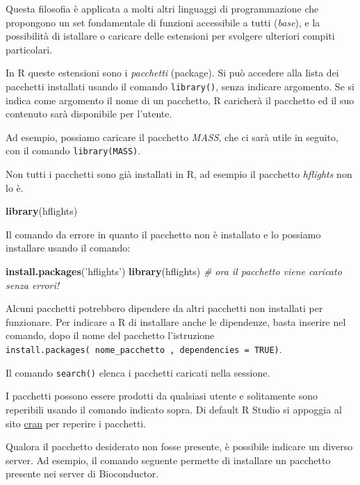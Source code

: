 \documentclass[]{book}
\newenvironment{Shaded}{\begin{snugshade}}{\end{snugshade}}
\newcommand{\CommentTok}[1]{\textcolor[rgb]{0.56,0.35,0.01}{\textit{#1}}}
\newcommand{\KeywordTok}[1]{\textcolor[rgb]{0.13,0.29,0.53}{\textbf{#1}}}
\newcommand{\NormalTok}[1]{#1}
\newcommand{\StringTok}[1]{\textcolor[rgb]{0.31,0.60,0.02}{#1}}
\begin{document}
Questa filosofia è applicata a molti altri linguaggi di programmazione che propongono un set fondamentale di funzioni accessibile a tutti (\emph{base}), e la possibilità di istallare o caricare delle estensioni per svolgere ulteriori compiti particolari.

In R queste estensioni sono i \emph{pacchetti} (package). Si può accedere alla lista dei pacchetti installati usando il comando \texttt{library()}, senza indicare argomento. Se si indica come argomento il nome di un pacchetto, R caricherà il pacchetto ed il suo contenuto sarà disponibile per l'utente.

Ad esempio, possiamo caricare il pacchetto \emph{MASS}, che ci sarà utile in seguito, con il comando \texttt{library(MASS)}.

Non tutti i pacchetti sono già installati in R, ad esempio il pacchetto \emph{hflights} non lo è.

\begin{Shaded}
\begin{Highlighting}[]
\KeywordTok{library}\NormalTok{(hflights)}
\end{Highlighting}
\end{Shaded}

Il comando da errore in quanto il pacchetto non è installato e lo possiamo installare usando il comando:

\begin{Shaded}
\begin{Highlighting}[]
\KeywordTok{install.packages}\NormalTok{(}\StringTok{'hflights'}\NormalTok{)}
\KeywordTok{library}\NormalTok{(hflights)}
\CommentTok{# ora il pacchetto viene caricato senza errori!}
\end{Highlighting}
\end{Shaded}

Alcuni pacchetti potrebbero dipendere da altri pacchetti non installati per funzionare. Per indicare a R di installare anche le dipendenze, basta inserire nel comando, dopo il nome del pacchetto l'istruzione \texttt{install.packages(\ nome\_pacchetto\ ,\ dependencies\ =\ TRUE)}.

Il comando \texttt{search()} elenca i pacchetti caricati nella sessione.

I pacchetti possono essere prodotti da qualsiasi utente e solitamente sono reperibili usando il comando indicato sopra. Di default R Studio si appoggia al sito \href{https://cran.r-project.org/}{cran} per reperire i pacchetti.

Qualora il pacchetto desiderato non fosse presente, è possibile indicare un diverso server. Ad esempio, il comando seguente permette di installare un pacchetto presente nei server di Bioconductor.
\end{document}
